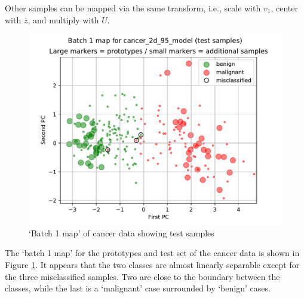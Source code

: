 Other samples can be mapped via the same transform, i.e., scale with $v_1$, center with $\overline{z}$, and multiply with $U$.\par
%
\begin{figure}
\caption{`Batch 1 map' of cancer data showing test samples}
\label{fig_batch_1_map_test}
%
\begin{center}
\includegraphics[height=0.4\textheight]{figures/cancer_batch_1_map_testing_data.pdf}
\end{center}
\end{figure}
%
The `batch 1 map' for the prototypes and test set of the cancer data is shown in Figure \ref{fig_batch_1_map_test}.
It appears that the two classes are almost linearly separable except for the three misclassified samples.
Two are close to the boundary between the classes, while the last is a `malignant' case surrounded by `benign' cases.
%
